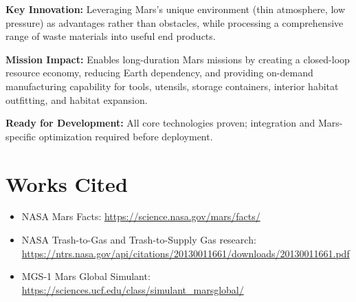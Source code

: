 \documentclass[12pt, a4paper]{article}
\begin{document}
\textbf{Key Innovation:} Leveraging Mars's unique environment (thin atmosphere, low pressure) as advantages rather than obstacles, while processing a comprehensive range of waste materials into useful end products.

\textbf{Mission Impact:} Enables long-duration Mars missions by creating a closed-loop resource economy, reducing Earth dependency, and providing on-demand manufacturing capability for tools, utensils, storage containers, interior habitat outfitting, and habitat expansion.

\textbf{Ready for Development:} All core technologies proven; integration and Mars-specific optimization required before deployment.

\section*{Works Cited}
\begin{itemize}
    \item NASA Mars Facts: \url{https://science.nasa.gov/mars/facts/}
    \item NASA Trash-to-Gas and Trash-to-Supply Gas research: \url{https://ntrs.nasa.gov/api/citations/20130011661/downloads/20130011661.pdf}
    \item MGS-1 Mars Global Simulant: \url{https://sciences.ucf.edu/class/simulant_marsglobal/}
\end{itemize}
\end{document}
